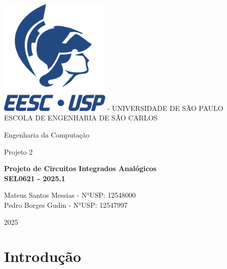 ﻿\documentclass[12pt,a4paper]{article}
\newcommand{\imprimirMateria}{Projeto de Circuitos Integrados Analógicos}
\newcommand{\imprimirCodMateria}{SEL0621}
\newcommand{\imprimirTitulo}{Projeto 2}
\newcommand{\imprimirSubtitulo}{Engenharia da Computação}
\newcommand{\imprimirAutores}{Mateus Santos Messias - N°USP: 12548000 \\ Pedro Borges Gudin - N°USP: 12547997}
\newcommand{\imprimirAno}{2025}
\begin{document}
\hypersetup{pageanchor=false}
\begin{titlepage}
    \begin{center}
        \vspace*{0.5cm}
        \includegraphics[width=0.4\textwidth]{images/Logo EESC-USP - Vertical Monocromatico Azul (ECM).png}
        -    
        \Large
        \vfill
        UNIVERSIDADE DE SÃO PAULO\\
        ESCOLA DE ENGENHARIA DE SÃO CARLOS\\
        \vspace{0.5cm}
        {\Large \imprimirSubtitulo \par}
        \vspace{1cm}
        
        {\Huge \imprimirTitulo \par}
        \vspace{1cm}
        \LARGE
        \textbf{
            \imprimirMateria{}\\
            \imprimirCodMateria{} - \imprimirAno.1
        }
        
        \vspace{3.5cm}
        
        {\large \imprimirAutores \par}
         \vfill
        
        \vspace{2cm}
        
        {\large \imprimirAno \par}
     \end{center}
\end{titlepage}
\newpage

\hypersetup{pageanchor=true}
\tableofcontents
\newpage

\section*{Introdução}
\end{document}
